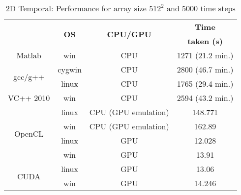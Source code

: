 \begin{table}[H]
\begin{center}
\vspace{0.3cm}
	\begin{tabular}{cccc}
	\hline \hline
		\rule{0pt}{2.6ex} & \multirow{2}{*}{\textbf{OS}} & \multirow{2}{*}{\textbf{CPU/GPU}}  & \textbf{Time}\\
		& &  & \textbf{taken (s)}\\
		\hline
		Matlab \rule{0pt}{2.6ex} & win & CPU &1271 (21.2 min.)\\
		\hline
		\multirow{2}{*}{gcc/g++} \rule{0pt}{2.6ex} & cygwin & CPU &2800 (46.7 min.)\\
		& linux & CPU &1765 (29.4 min.)\\
		\hline
		VC++ 2010 \rule{0pt}{2.6ex} & win & CPU &2594 (43.2 min.)\\
		\hline
		\multirow{4}{*}{OpenCL} \rule{0pt}{2.6ex} & linux & CPU (GPU emulation) &148.771\\
		& win & CPU (GPU emulation) &162.89\\
		& linux & GPU &12.028\\
		& win & GPU &13.91\\
		\hline
		\multirow{2}{*}{CUDA} \rule{0pt}{2.6ex} & linux & GPU &13.06\\
		& win & GPU &14.246\\
	\hline \hline
	\end{tabular}
\end{center}
\caption{2D Temporal: Performance for array size $512^2$ and 5000 time steps}
\label{Tab:Performance-2D-time-5000-steps}
\end{table}
